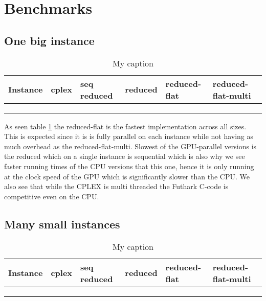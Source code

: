 \section{Benchmarks}
\subsection{One big instance}
\begin{table}[H]
	\centering
	\caption{My caption}
	\label{table:one_big_instance}
	\begin{tabular}{|l|l|l|l|l|l|}\hline
		Instance & cplex & seq reduced & reduced & reduced-flat & reduced-flat-multi \\\hline
		&       &             &         &              &                    \\\hline
		&       &             &         &              &                    \\\hline
		&       &             &         &              &                   \\\hline
	\end{tabular}
\end{table}

As seen table \ref{table:one_big_instance} the reduced-flat is the fastest implementation across all sizes. This is expected since it is is fully parallel on each instance while not having as much overhead as the reduced-flat-multi. Slowest of the GPU-parallel versions is the reduced which on a single instance is sequential which is also why we see faster running times of the CPU versions that this one, hence it is only running at the clock speed of the GPU which is significantly slower than the CPU. We also see that while the CPLEX is multi threaded the Futhark C-code is competitive even on the CPU. 

\subsection{Many small instances}
\begin{table}[H]
	\centering
	\caption{My caption}
	\label{table:many_small_instances}
	\begin{tabular}{|l|l|l|l|l|l|}\hline
		Instance & cplex & seq reduced & reduced & reduced-flat & reduced-flat-multi \\\hline
		&       &             &         &              &                    \\\hline
		&       &             &         &              &                    \\\hline
		&       &             &         &              &                   \\\hline
	\end{tabular}
\end{table}

